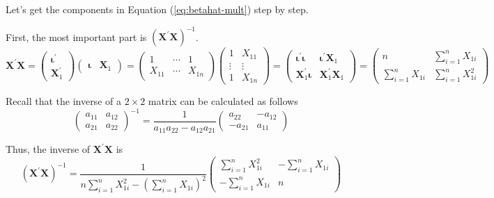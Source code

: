 \documentclass[a4paper,11pt]{article}
\begin{document}
Let's get the components in Equation (\ref{eq:betahat-mult}) step by
step.

First, the most important part is \(\left(\mathbf{X}^{\prime}
\mathbf{X}\right)^{-1}\).
\begin{equation*}
\mathbf{X}^{\prime}\mathbf{X} =
\begin{pmatrix}
\boldsymbol{\iota}^{\prime} \\
\mathbf{X}_1^{\prime}
\end{pmatrix}
\begin{pmatrix}
\boldsymbol{\iota} & \mathbf{X}_1
\end{pmatrix} =
\begin{pmatrix}
1 & \cdots & 1 \\
X_{11} & \cdots & X_{1n}
\end{pmatrix}
\begin{pmatrix}
1 & X_{11} \\
\vdots & \vdots \\
1 & X_{1n}
\end{pmatrix} =
\begin{pmatrix}
\boldsymbol{\iota}^{\prime} \boldsymbol{\iota} & \boldsymbol{\iota}^{\prime} \mathbf{X}_1 \\
\mathbf{X}_1^{\prime} \boldsymbol{\iota} & \mathbf{X}_1^{\prime} \mathbf{X}_1
\end{pmatrix} =
\begin{pmatrix}
n & \sum_{i=1}^n X_{1i} \\
\sum_{i=1}^n X_{1i} & \sum_{i=1}^n X_{1i}^2
\end{pmatrix}
\end{equation*}

Recall that the inverse of a \(2 \times 2\) matrix can be calculated as follows
\begin{equation*}
\begin{pmatrix}
a_{11} & a_{12} \\
a_{21} & a_{22}
\end{pmatrix}^{-1}
=\frac{1}{a_{11}a_{22} - a_{12}a_{21}}
\begin{pmatrix}
a_{22} & -a_{12} \\
-a_{21} & a_{11}
\end{pmatrix}
\end{equation*}

Thus, the inverse of \(\mathbf{X}^{\prime}\mathbf{X}\) is
\begin{equation*}
\left(\mathbf{X}^{\prime}\mathbf{X}\right)^{-1} =
\frac{1}{n \sum_{i=1}^n X_{1i}^2 - (\sum_{i=1}^n X_{1i})^2}
\begin{pmatrix}
\sum_{i=1}^n X_{1i}^2 & - \sum_{i=1}^n X_{1i} \\
-\sum_{i=1}^n X_{1i} & n
\end{pmatrix}
\end{equation*}
\end{document}
